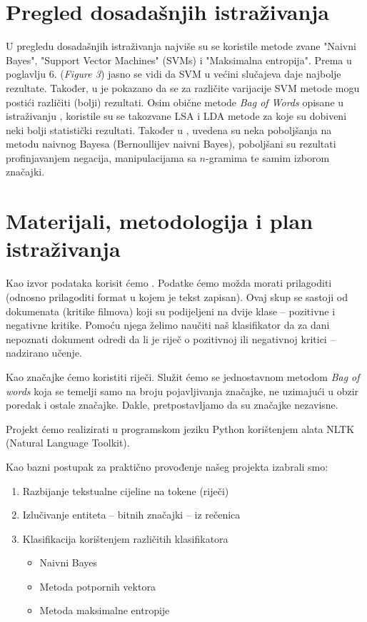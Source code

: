 \documentclass[12pt,a4paper,titlepage]{article}
\begin{document}
\section{Pregled dosadašnjih istraživanja}

U pregledu dosadašnjih istraživanja najviše su se koristile metode zvane "Naivni Bayes", "Support Vector Machines" (\textsc{SVM}s) i "Maksimalna entropija". Prema \cite{Pang:2002:TUS:1118693.1118704} u poglavlju 6. (\textit{Figure 3}) jasno se vidi da \textsc{SVM} u većini slučajeva daje najbolje rezultate. Također, u \cite{stan} je pokazano da se za različite varijacije \textsc{SVM} metode mogu postići različiti (bolji) rezultati. Osim obične metode \textit{Bag of Words} opisane u istraživanju \cite{maas-EtAl:2011:ACL-HLT2011}, koristile su se takozvane \textsc{LSA} i \textsc{LDA} metode za koje su dobiveni neki bolji statistički rezultati. Također u \cite{SaLAD:LAS}, uvedena su neka poboljšanja na metodu naivnog Bayesa (Bernoullijev naivni Bayes), poboljšani su rezultati profinjavanjem negacija, manipulacijama sa $n$-gramima te samim izborom značajki.

\section{Materijali, metodologija i plan istraživanja}

Kao izvor podataka korisit ćemo \cite{dataset}. Podatke ćemo možda morati prilagoditi (odnosno prilagoditi format u kojem je tekst zapisan). Ovaj skup se sastoji od dokumenata (kritike filmova) koji su podijeljeni na dvije klase -- pozitivne i negativne kritike. Pomoću njega želimo naučiti naš klasifikator da za dani nepoznati dokument odredi da li je riječ o pozitivnoj ili negativnoj kritici -- nadzirano učenje.

Kao značajke ćemo koristiti riječi. Služit ćemo se jednostavnom metodom \textit{Bag of words} koja se temelji samo na broju pojavljivanja značajke, ne uzimajući u obzir poredak i ostale značajke. Dakle, pretpostavljamo da su značajke nezavisne.

Projekt ćemo realizirati u programskom jeziku Python korištenjem alata NLTK (Natural Language Toolkit). 

Kao bazni postupak za praktično provođenje našeg projekta izabrali smo:

\begin{enumerate}
  \item Razbijanje tekstualne cijeline na tokene (riječi)
  \item Izlučivanje entiteta -- bitnih značajki -- iz rečenica
  \item Klasifikacija korištenjem različitih klasifikatora
  \begin{itemize}
    \item Naivni Bayes
    \item Metoda potpornih vektora
    \item Metoda maksimalne entropije
  \end{itemize}
\end{enumerate}
\end{document}
